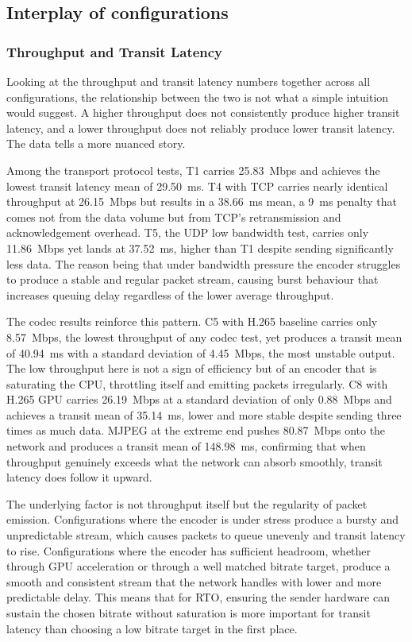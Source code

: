 \subsection{Interplay of configurations}\label{subsec:discInterplay}

\subsubsection{Throughput and Transit Latency}

Looking at the throughput and transit latency numbers together across all configurations, the relationship between the two is not what a simple intuition would suggest. A higher throughput does not consistently produce higher transit latency, and a lower throughput does not reliably produce lower transit latency. The data tells a more nuanced story.

Among the transport protocol tests, T1 carries 25.83~Mbps and achieves the lowest transit latency mean of 29.50~ms. T4 with TCP carries nearly identical throughput at 26.15~Mbps but results in a 38.66~ms mean, a 9~ms penalty that comes not from the data volume but from TCP's retransmission and acknowledgement overhead. T5, the UDP low bandwidth test, carries only 11.86~Mbps yet lands at 37.52~ms, higher than T1 despite sending significantly less data. The reason being that under bandwidth pressure the encoder struggles to produce a stable and regular packet stream, causing burst behaviour that increases queuing delay regardless of the lower average throughput.

The codec results reinforce this pattern. C5 with H.265 baseline carries only 8.57~Mbps, the lowest throughput of any codec test, yet produces a transit mean of 40.94~ms with a standard deviation of 4.45~Mbps, the most unstable output. The low throughput here is not a sign of efficiency but of an encoder that is saturating the CPU, throttling itself and emitting packets irregularly. C8 with H.265 GPU carries 26.19~Mbps at a standard deviation of only 0.88~Mbps and achieves a transit mean of 35.14~ms, lower and more stable despite sending three times as much data. MJPEG at the extreme end pushes 80.87~Mbps onto the network and produces a transit mean of 148.98~ms, confirming that when throughput genuinely exceeds what the network can absorb smoothly, transit latency does follow it upward.

The underlying factor is not throughput itself but the regularity of packet emission. Configurations where the encoder is under stress produce a bursty and unpredictable stream, which causes packets to queue unevenly and transit latency to rise. Configurations where the encoder has sufficient headroom, whether through GPU acceleration or through a well matched bitrate target, produce a smooth and consistent stream that the network handles with lower and more predictable delay. This means that for RTO, ensuring the sender hardware can sustain the chosen bitrate without saturation is more important for transit latency than choosing a low bitrate target in the first place.

